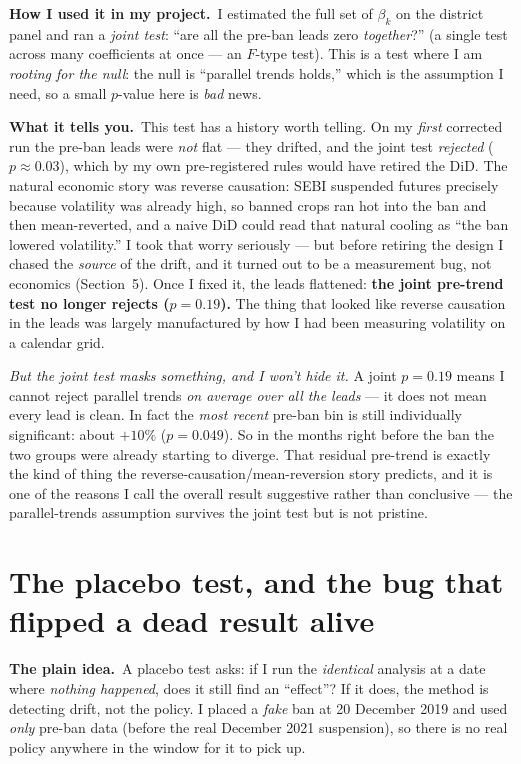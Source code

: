 \documentclass[11pt]{article}
\newcommand{\intuit}{\smallskip\noindent\textbf{The plain idea.}\ }
\newcommand{\applied}{\smallskip\noindent\textbf{How I used it in my project.}\ }
\newcommand{\tells}{\smallskip\noindent\textbf{What it tells you.}\ }
\begin{document}
\applied I estimated the full set of $\beta_k$ on the district panel and ran a \emph{joint test}:
``are all the pre-ban leads zero \emph{together}?'' (a single test across many coefficients at once
--- an $F$-type test). This is a test where I am \emph{rooting for the null}: the null is ``parallel
trends holds,'' which is the assumption I need, so a small $p$-value here is \emph{bad} news.

\tells This test has a history worth telling. On my \emph{first} corrected run the pre-ban leads
were \emph{not} flat --- they drifted, and the joint test \emph{rejected} ($p\approx0.03$), which by
my own pre-registered rules would have retired the DiD. The natural economic story was reverse
causation: SEBI suspended futures precisely because volatility was already high, so banned crops ran
hot into the ban and then mean-reverted, and a naive DiD could read that natural cooling as ``the ban
lowered volatility.'' I took that worry seriously --- but before retiring the design I chased the
\emph{source} of the drift, and it turned out to be a measurement bug, not economics (Section~5). Once
I fixed it, the leads flattened: \textbf{the joint pre-trend test no longer rejects ($p = 0.19$).}
The thing that looked like reverse causation in the leads was largely manufactured by how I had been
measuring volatility on a calendar grid.

\smallskip\noindent\emph{But the joint test masks something, and I won't hide it.} A joint
$p=0.19$ means I cannot reject parallel trends \emph{on average over all the leads} --- it does not
mean every lead is clean. In fact the \emph{most recent} pre-ban bin is still individually
significant: about $+10\%$ ($p=0.049$). So in the months right before the ban the two groups were
already starting to diverge. That residual pre-trend is exactly the kind of thing the
reverse-causation/mean-reversion story predicts, and it is one of the reasons I call the overall
result suggestive rather than conclusive --- the parallel-trends assumption survives the joint test
but is not pristine.

\section{The placebo test, and the bug that flipped a dead result alive}

\intuit A placebo test asks: if I run the \emph{identical} analysis at a date where \emph{nothing
happened}, does it still find an ``effect''? If it does, the method is detecting drift, not the
policy. I placed a \emph{fake} ban at 20 December 2019 and used \emph{only} pre-ban data (before the
real December 2021 suspension), so there is no real policy anywhere in the window for it to pick up.
\end{document}

